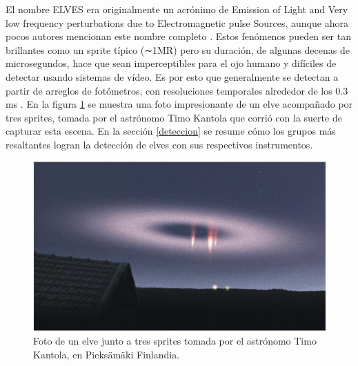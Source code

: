 \documentclass[12pt,oneside,openany,letter]{book}
\begin{document}
El nombre ELVES era originalmente un acrónimo de Emission of Light and Very low frequency perturbations due to Electromagnetic pulse Sources, aunque ahora pocos autores mencionan este nombre completo \cite{DwyerUman2014}. Estos fenómenos pueden ser tan brillantes como un sprite típico (∼1MR) pero su duración, de algunas decenas de microsegundos, hace que sean imperceptibles para el ojo humano y difíciles de detectar usando sistemas de vídeo. Es por esto que generalmente se detectan a partir de arreglos de fotómetros, con resoluciones temporales alrededor de los 0.3 ms \cite{Maiorana2014}. En la figura \ref{fig:elves_photo} se muestra una foto impresionante de un elve acompañado por tres sprites, tomada por el astrónomo Timo Kantola que corrió con la suerte de capturar esta escena. En la sección \ref{deteccion} se resume cómo  los grupos más resaltantes logran la detección de elves con sus respectivos instrumentos. 
\begin{figure}
    \centering
    \includegraphics[scale=0.65]{figures/elves_photo.png}
    \caption[Foto de un elve tomada por el astrónomo Timo Kantola]{Foto de un elve junto a tres sprites tomada por el astrónomo Timo Kantola, en Pieksämäki Finlandia.}
    \label{fig:elves_photo}
\end{figure} 

\end{document}
